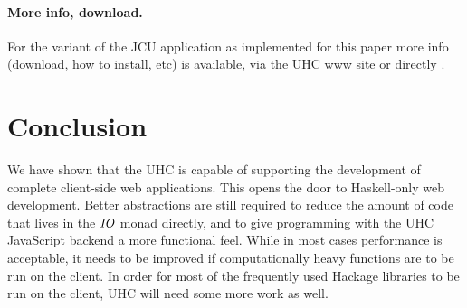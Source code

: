 \documentclass{llncs}
\begin{document}



\paragraph{More info, download.}

For the variant of the JCU application as implemented for this paper more info (download, how to install, etc)
is available, via the UHC www site \cite{www09uhc} or directly \cite{www12uhc-js-backend}.

\section{Conclusion}

\label{conclusion}
We have shown that the UHC is capable of supporting the development of complete
client-side web applications. This opens the door to Haskell-only web
development. Better abstractions are still required to reduce the amount of
code that lives in the \ensuremath{\ty{IO}} monad directly, and to give programming with the
UHC JavaScript backend a more functional feel. While in most cases performance
is acceptable, it needs to be improved if computationally heavy functions are
to be run on the client. In order for most of the frequently used Hackage
libraries to be run on the client, UHC will need some more work as well.



{\sloppy\raggedright
\small
\setlength{\parskip}{-.2ex}
\def\newblock{\hskip -.2em}

}
\end{document}

